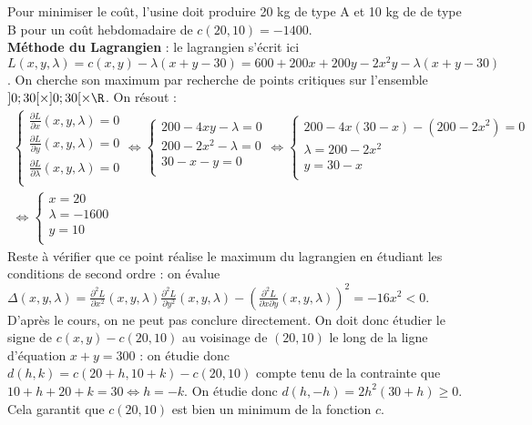 {\begin{enumerate}
{\begin{itemize}
\begin{itemize}
				Pour minimiser le coût, l'usine doit produire 20 kg de type A et 10 kg de de type B pour un coût hebdomadaire de $c(20,10) = -1400$.  \\
				\textbf{Méthode du Lagrangien} : le lagrangien s'écrit ici $L(x,y,\lambda) = c(x,y)-\lambda(x+y-30) = 600+200x+200y-2x^2y-\lambda(x+y-30)$. On cherche son maximum par recherche de points critiques sur l'ensemble $]0;30[\times]0;30[\times\R$. On résout :
				\begin{align*}
					\begin{cases}
						\frac{\partial L}{\partial x}(x,y,\lambda) = 0\\
						\frac{\partial L}{\partial y}(x,y,\lambda) = 0\\
						\frac{\partial L}{\partial \lambda}(x,y,\lambda) = 0\\
					\end{cases}
					\Leftrightarrow
					\begin{cases}
						200-4xy-\lambda = 0\\
						200-2x^2-\lambda = 0\\
						30-x-y = 0\\
					\end{cases}
					\Leftrightarrow
					\begin{cases}
						200-4x(30-x)-(200-2x^2) = 0\\
						\lambda = 200-2x^2\\
						y= 30-x\\
					\end{cases} \\
					\Leftrightarrow \begin{cases}
						x = 20\\
						\lambda = -1600\\
						y= 10\\
					\end{cases}
				\end{align*}
				Reste à vérifier que ce point réalise le maximum du lagrangien en étudiant les conditions de second ordre : on évalue $\Delta(x,y,\lambda) = \frac{\partial^2 L}{\partial x^2}(x,y,\lambda)\frac{\partial^2 L}{\partial y^2}(x,y,\lambda) - \left(\frac{\partial^2 L}{\partial x \partial y}(x,y,\lambda) \right)^2 = -16x^2<0$. D'après le cours, on ne peut pas conclure directement. On doit donc étudier le signe de $c(x,y)-c(20,10)$ au voisinage de $(20,10)$ le long de la ligne d'équation $x+y=300$ : on étudie donc $d(h,k)=c(20+h,10+k)-c(20,10)$ compte tenu de la contrainte que $10+h+20+k = 30 \iff h=-k$. On étudie donc $d(h,-h) =  2h^2(30+h) \geq 0$. Cela garantit que $c(20,10)$ est bien un minimum de la fonction $c$.
			\end{itemize}
		\end{itemize}
		
	}
\end{enumerate}}
